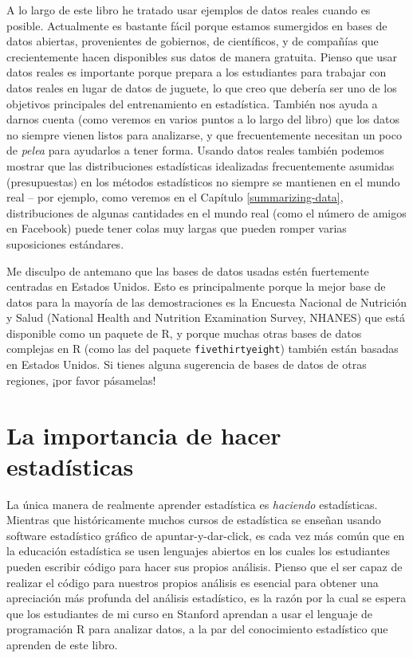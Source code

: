 \documentclass[
  12pt,
]{book}
\theoremstyle{definition}
\theoremstyle{definition}
\theoremstyle{definition}
\theoremstyle{remark}
\begin{document}
A lo largo de este libro he tratado usar ejemplos de datos reales cuando es posible. Actualmente es bastante fácil porque estamos sumergidos en bases de datos abiertas, provenientes de gobiernos, de científicos, y de compañías que crecientemente hacen disponibles sus datos de manera gratuita. Pienso que usar datos reales es importante porque prepara a los estudiantes para trabajar con datos reales en lugar de datos de juguete, lo que creo que debería ser uno de los objetivos principales del entrenamiento en estadística. También nos ayuda a darnos cuenta (como veremos en varios puntos a lo largo del libro) que los datos no siempre vienen listos para analizarse, y que frecuentemente necesitan un poco de \emph{pelea} para ayudarlos a tener forma. Usando datos reales también podemos mostrar que las distribuciones estadísticas idealizadas frecuentemente asumidas (presupuestas) en los métodos estadísticos no siempre se mantienen en el mundo real -- por ejemplo, como veremos en el Capítulo \ref{summarizing-data}, distribuciones de algunas cantidades en el mundo real (como el número de amigos en Facebook) puede tener colas muy largas que pueden romper varias suposiciones estándares.

Me disculpo de antemano que las bases de datos usadas estén fuertemente centradas en Estados Unidos. Esto es principalmente porque la mejor base de datos para la mayoría de las demostraciones es la Encuesta Nacional de Nutrición y Salud (National Health and Nutrition Examination Survey, NHANES) que está disponible como un paquete de R, y porque muchas otras bases de datos complejas en R (como las del paquete \texttt{fivethirtyeight}) también están basadas en Estados Unidos. Si tienes alguna sugerencia de bases de datos de otras regiones, ¡por favor pásamelas!

\hypertarget{la-importancia-de-hacer-estaduxedsticas}{%
\section{La importancia de hacer estadísticas}\label{la-importancia-de-hacer-estaduxedsticas}}

La única manera de realmente aprender estadística es \emph{haciendo} estadísticas. Mientras que históricamente muchos cursos de estadística se enseñan usando software estadístico gráfico de apuntar-y-dar-click, es cada vez más común que en la educación estadística se usen lenguajes abiertos en los cuales los estudiantes pueden escribir código para hacer sus propios análisis. Pienso que el ser capaz de realizar el código para nuestros propios análisis es esencial para obtener una apreciación más profunda del análisis estadístico, es la razón por la cual se espera que los estudiantes de mi curso en Stanford aprendan a usar el lenguaje de programación R para analizar datos, a la par del conocimiento estadístico que aprenden de este libro.
\end{document}
